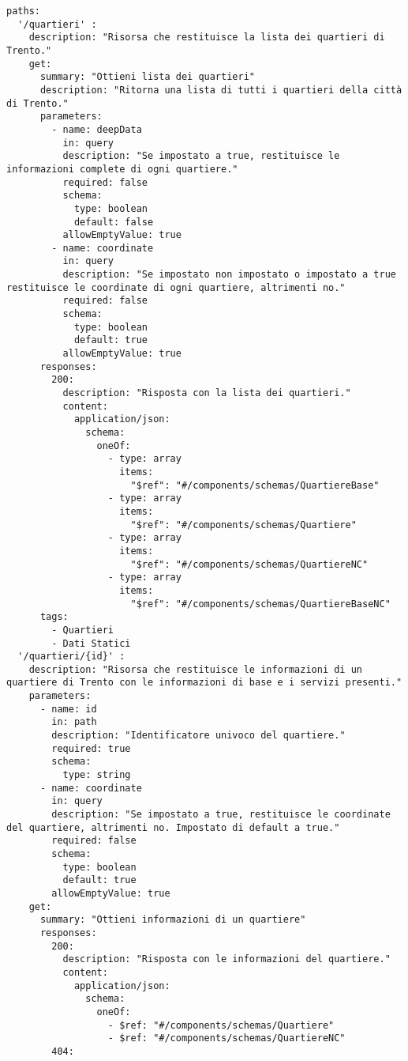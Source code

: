 \begin{verbatim}
paths:
  '/quartieri' :
    description: "Risorsa che restituisce la lista dei quartieri di Trento."
    get: 
      summary: "Ottieni lista dei quartieri"
      description: "Ritorna una lista di tutti i quartieri della città di Trento."
      parameters:
        - name: deepData
          in: query
          description: "Se impostato a true, restituisce le informazioni complete di ogni quartiere."
          required: false
          schema:
            type: boolean
            default: false
          allowEmptyValue: true
        - name: coordinate
          in: query
          description: "Se impostato non impostato o impostato a true restituisce le coordinate di ogni quartiere, altrimenti no."
          required: false
          schema:
            type: boolean
            default: true
          allowEmptyValue: true
      responses: 
        200: 
          description: "Risposta con la lista dei quartieri."
          content:
            application/json:
              schema: 
                oneOf:
                  - type: array
                    items: 
                      "$ref": "#/components/schemas/QuartiereBase"
                  - type: array
                    items: 
                      "$ref": "#/components/schemas/Quartiere"
                  - type: array
                    items: 
                      "$ref": "#/components/schemas/QuartiereNC"
                  - type: array
                    items: 
                      "$ref": "#/components/schemas/QuartiereBaseNC"
      tags:
        - Quartieri
        - Dati Statici
  '/quartieri/{id}' :
    description: "Risorsa che restituisce le informazioni di un quartiere di Trento con le informazioni di base e i servizi presenti."
    parameters:
      - name: id
        in: path
        description: "Identificatore univoco del quartiere."
        required: true
        schema:
          type: string
      - name: coordinate
        in: query
        description: "Se impostato a true, restituisce le coordinate del quartiere, altrimenti no. Impostato di default a true."
        required: false
        schema:
          type: boolean
          default: true
        allowEmptyValue: true
    get: 
      summary: "Ottieni informazioni di un quartiere"
      responses: 
        200:
          description: "Risposta con le informazioni del quartiere."
          content:
            application/json: 
              schema:
                oneOf:
                  - $ref: "#/components/schemas/Quartiere"
                  - $ref: "#/components/schemas/QuartiereNC"
        404: 

\end{verbatim}
